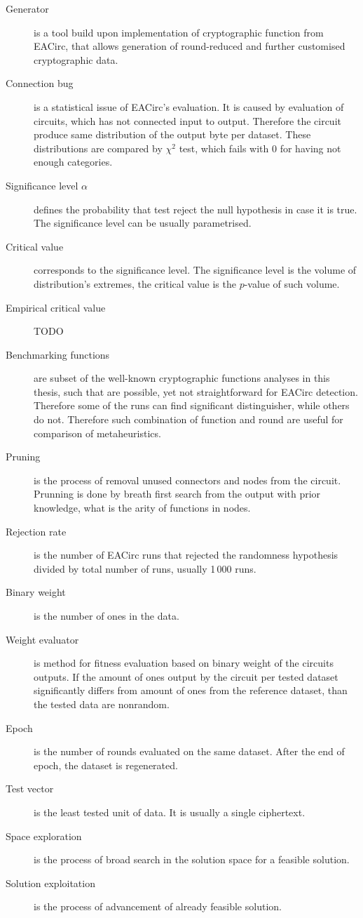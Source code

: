\documentclass[
  print, %
  Table,   %
  nolof,     %
  nolot,     %
  11pt, %
  oneside  %
]{fithesis3}
\begin{document}
\begin{description}
    \item[Generator] is a tool build upon implementation of cryptographic function from EACirc, that allows generation of round-reduced and further customised cryptographic data.
    \item[Connection bug] is a statistical issue of EACirc's evaluation. It is caused by evaluation of circuits, which has not connected input to output. Therefore the circuit produce same distribution of the output byte per dataset. These distributions are compared by $\chi^{2}$ test, which fails with 0 for having not enough categories.
    \item[Significance level $\alpha$] defines the probability that test reject the null hypothesis in case it is true. The significance level can be usually parametrised.
    \item[Critical value] corresponds to the significance level. The significance level is the volume of distribution's extremes, the critical value is the $p$-value of such volume.
    \item[Empirical critical value] TODO
    
    \item[Benchmarking functions] are subset of the well-known cryptographic functions analyses in this thesis, such that are possible, yet not straightforward for EACirc detection. Therefore some of the runs can find significant distinguisher, while others do not. Therefore such combination of function and round are useful for comparison of metaheuristics.
    \item[Pruning] is the process of removal unused connectors and nodes from the circuit. Prunning is done by breath first search from the output with prior knowledge, what is the arity of functions in nodes.
    \item[Rejection rate] is the number of EACirc runs that rejected the randomness hypothesis divided by total number of runs, usually 1\,000 runs.
    \item[Binary weight] is the number of ones in the data.
    \item[Weight evaluator] is method for fitness evaluation based on binary weight of the circuits outputs. If the amount of ones output by the circuit per tested dataset significantly differs from amount of ones from the reference dataset, than the tested data are nonrandom.
    \item[Epoch] is the number of rounds evaluated on the same dataset. After the end of epoch, the dataset is regenerated.
    \item[Test vector] is the least tested unit of data. It is usually a single ciphertext.
    \item[Space exploration] is the process of broad search in the solution space for a feasible solution.
    \item[Solution exploitation] is the process of advancement of already feasible solution.


\end{description}
\end{document}
